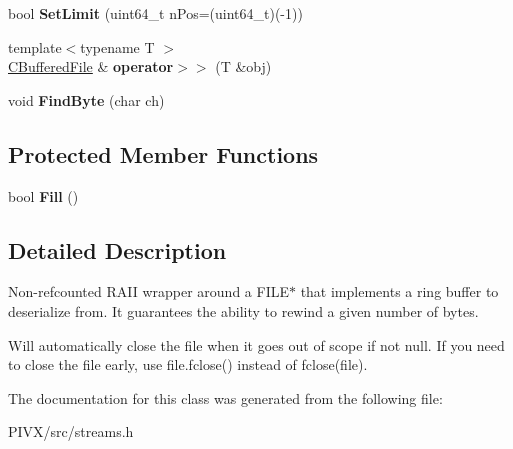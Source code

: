 \begin{DoxyCompactItemize}
bool {\bfseries Set\+Limit} (uint64\+\_\+t n\+Pos=(uint64\+\_\+t)(-\/1))
\item 
\mbox{\label{class_c_buffered_file_ab570d5f1a173a41100e7b42b4aacbbc5}} 
{\footnotesize template$<$typename T $>$ }\\\mbox{\hyperlink{class_c_buffered_file}{C\+Buffered\+File}} \& {\bfseries operator$>$$>$} (T \&obj)
\item 
\mbox{\label{class_c_buffered_file_a15ce0683ba5925939d33f098a948236b}} 
void {\bfseries Find\+Byte} (char ch)
\end{DoxyCompactItemize}
\subsection*{Protected Member Functions}
\begin{DoxyCompactItemize}
\item 
\mbox{\label{class_c_buffered_file_a2c93fc60c4460bd1ccf90922646b19b8}} 
bool {\bfseries Fill} ()
\end{DoxyCompactItemize}


\subsection{Detailed Description}
Non-\/refcounted R\+A\+II wrapper around a F\+I\+L\+E$\ast$ that implements a ring buffer to deserialize from. It guarantees the ability to rewind a given number of bytes.

Will automatically close the file when it goes out of scope if not null. If you need to close the file early, use file.\+fclose() instead of fclose(file). 

The documentation for this class was generated from the following file\+:\begin{DoxyCompactItemize}
\item 
P\+I\+V\+X/src/streams.\+h\end{DoxyCompactItemize}
